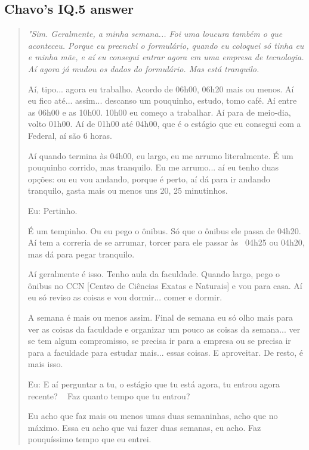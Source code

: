 \subsection{Chavo’s IQ.5 answer}
\label{interview-exc-ss:chavo-iq5}

\begin{quote}
    \itshape
    "Sim. Geralmente, a minha semana... Foi uma loucura também o que aconteceu. Porque eu preenchi o formulário, quando eu coloquei só tinha eu e minha mãe, e aí eu consegui entrar agora em uma empresa de tecnologia. Aí agora já mudou os dados do formulário. Mas está tranquilo. 
    
    Aí, tipo... agora eu trabalho. Acordo de 06h00, 06h20 mais ou menos. Aí eu fico até... assim... descanso um pouquinho, estudo, tomo café. Aí entre as 06h00 e as 10h00. 10h00 eu começo a trabalhar. Aí para de meio-dia, volto 01h00. Aí de 01h00 até 04h00, que é o estágio que eu consegui com a Federal, aí são 6 horas.

    Aí quando termina às 04h00, eu largo, eu me arrumo literalmente. É um pouquinho corrido, mas tranquilo. Eu me arrumo... aí eu tenho duas opções: ou eu vou andando, porque é perto, aí dá para ir andando tranquilo, gasta mais ou menos uns 20, 25 minutinhos.

    \colorbox{black!15}{Eu: Pertinho.}
    
    É um tempinho. Ou eu pego o ônibus. Só que o ônibus ele passa de 04h20. Aí tem a correria de se arrumar, torcer para ele passar às  04h25 ou 04h20, mas dá para pegar tranquilo. 
    
    Aí geralmente é isso. Tenho aula da faculdade. Quando largo, pego o ônibus no CCN [Centro de Ciências Exatas e Naturais] e vou para casa. Aí eu só reviso as coisas e vou dormir... comer e dormir.
    
    A semana é mais ou menos assim. Final de semana eu só olho mais para ver as coisas da faculdade e organizar um pouco as coisas da semana... ver se tem algum compromisso, se precisa ir para a empresa ou se precisa ir para a faculdade para estudar mais... essas coisas. E aproveitar. De resto, é mais isso.

    
    \colorbox{black!15}{Eu: E aí perguntar a tu, o estágio que tu está agora, tu entrou agora recente? \ } \colorbox{black!15}{Faz quanto tempo que tu entrou?}
    
    Eu acho que faz mais ou menos umas duas semaninhas, acho que no máximo. Essa eu acho que vai fazer duas semanas, eu acho. Faz pouquíssimo tempo que eu entrei.


\end{quote}
